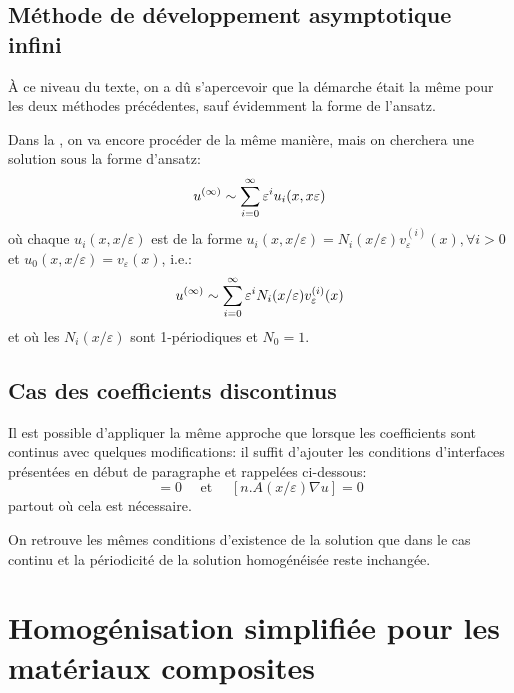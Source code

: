 \medskip
\subsection{Méthode de développement asymptotique infini}

À ce niveau du texte, on a dû s'apercevoir que la démarche était la même
pour les deux méthodes précédentes, sauf évidemment la forme de l'ansatz.

Dans la , on va encore procéder
de la même manière, mais on cherchera une solution sous la forme d'ansatz:
\begin{equation}
u^{(\infty)} \sim \displaystyle\sum_{i=0}^\infty \varepsilon^i u_i(x,x\varepsilon)
\end{equation}
où chaque $u_i(x,x/\varepsilon)$ est de la forme $u_i(x,x/\varepsilon)=N_i(x/\varepsilon)v_\varepsilon^{(i)}(x),
\forall i>0$ et $u_0(x,x/\varepsilon)=v_\varepsilon(x)$, i.e.:
\begin{equation}
u^{(\infty)} \sim \displaystyle\sum_{i=0}^\infty \varepsilon^i N_i(x/\varepsilon)v_\varepsilon^{(i)}(x)
\end{equation}
et où les $N_i(x/\varepsilon)$ sont 1-périodiques et $N_0=1$.



\medskip
\subsection{Cas des coefficients discontinus}

Il est possible d'appliquer la même approche que lorsque les coefficients sont continus
avec quelques modifications: il \og suffit \fg{} d'ajouter les conditions d'interfaces présentées 
en début de paragraphe et rappelées ci-dessous:
\begin{equation} [u]=0 \quad \text{ et } \quad [n.A(x/\varepsilon)\nabla u] = 0\end{equation}
partout où cela est nécessaire.

On retrouve les mêmes conditions d'existence de la solution que dans le cas
continu et la périodicité de la solution homogénéisée reste inchangée.










\medskip
\section{Homogénisation simplifiée pour les matériaux composites}


